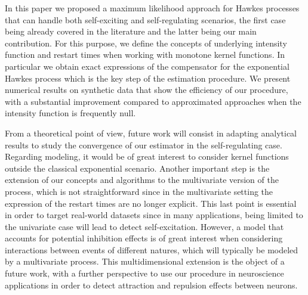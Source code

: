 In this paper we proposed a maximum likelihood approach for Hawkes processes that can handle both self-exciting and self-regulating scenarios, the first case being already covered in the literature and the latter being our main contribution. For this purpose, we define the concepts of underlying intensity function and restart times when working with monotone kernel functions. In particular we obtain exact expressions of the compensator for the exponential Hawkes process which is the key step of the estimation procedure.
We present numerical results on synthetic data that show the efficiency of our procedure, with a substantial improvement compared to approximated approaches when the intensity function is frequently null.

From a theoretical point of view, future work will consist in adapting analytical results to study the convergence of our estimator in the self-regulating case. Regarding modeling, it would be of great interest to consider kernel functions outside the classical exponential scenario.
Another important step is the extension of our concepts and algorithms to the multivariate version of the process, which is not straightforward since in the multivariate setting the expression of the restart times are no longer explicit.
This last point is essential in order to target real-world datasets since in many applications, being limited to the univariate case will lead to detect self-excitation. However, a model that accounts for potential inhibition effects is of great interest when considering interactions between events of different natures, which will typically be modeled by a multivariate process. This multidimensional extension is the object of a future work, with a further perspective to use our procedure in neuroscience applications in order to detect attraction and repulsion effects between neurons.

